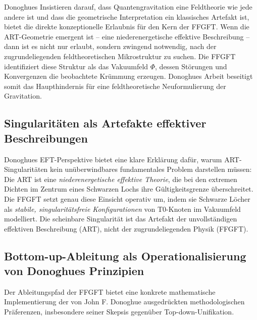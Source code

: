 	Donoghues Insistieren darauf, dass Quantengravitation eine Feldtheorie wie jede andere ist und dass die geometrische Interpretation ein klassisches Artefakt ist, bietet die direkte konzeptionelle Erlaubnis für den Kern der FFGFT. Wenn die ART-Geometrie emergent ist – eine niederenergetische effektive Beschreibung – dann ist es nicht nur erlaubt, sondern zwingend notwendig, nach der zugrundeliegenden feldtheoretischen Mikrostruktur zu suchen. Die FFGFT identifiziert diese Struktur als das Vakuumfeld $\Phi$, dessen Störungen und Konvergenzen die beobachtete Krümmung erzeugen. Donoghues Arbeit beseitigt somit das Haupthindernis für eine feldtheoretische Neuformulierung der Gravitation.
	
	\subsection{Singularitäten als Artefakte effektiver Beschreibungen}
	
	Donoghues EFT-Perspektive bietet eine klare Erklärung dafür, warum ART-Singularitäten kein unüberwindbares fundamentales Problem darstellen müssen: Die ART ist eine \emph{niederenergetische effektive Theorie}, die bei den extremen Dichten im Zentrum eines Schwarzen Lochs ihre Gültigkeitsgrenze überschreitet. Die FFGFT setzt genau diese Einsicht operativ um, indem sie Schwarze Löcher als \emph{stabile, singularitätsfreie Konfigurationen} von T0-Knoten im Vakuumfeld modelliert. Die scheinbare Singularität ist das Artefakt der unvollständigen effektiven Beschreibung (ART), nicht der zugrundeliegenden Physik (FFGFT).
	
	\subsection{Bottom-up-Ableitung als Operationalisierung von Donoghues Prinzipien}
	
	Der Ableitungspfad der FFGFT bietet eine konkrete mathematische Implementierung der von John F. Donoghue ausgedrückten methodologischen Präferenzen, insbesondere seiner Skepsis gegenüber Top-down-Unifikation.
	
